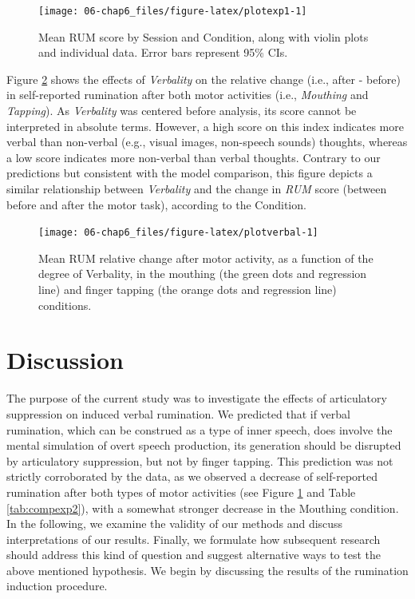 \documentclass[a4paper,12pt,twoside,openright,oldfontcommands]{memoir}
\begin{document}
\begin{figure}[H]
\texttt{[image: 06-chap6\_files/figure-latex/plotexp1-1]} \caption{Mean RUM score by Session and Condition, along with violin plots and individual data. Error bars represent 95\% CIs.}\label{fig:plotexp1}
\end{figure}

Figure \ref{fig:plotverbal} shows the effects of \emph{Verbality} on the relative change (i.e., after - before) in self-reported rumination after both motor activities (i.e., \emph{Mouthing} and \emph{Tapping}). As \emph{Verbality} was centered before analysis, its score cannot be interpreted in absolute terms. However, a high score on this index indicates more verbal than non-verbal (e.g., visual images, non-speech sounds) thoughts, whereas a low score indicates more non-verbal than verbal thoughts. Contrary to our predictions but consistent with the model comparison, this figure depicts a similar relationship between \emph{Verbality} and the change in \emph{RUM} score (between before and after the motor task), according to the Condition.

\begin{figure}[H]
\texttt{[image: 06-chap6\_files/figure-latex/plotverbal-1]} \caption{Mean RUM relative change after motor activity, as a function of the degree of Verbality, in the mouthing (the green dots and regression line) and finger tapping (the orange dots and regression line) conditions.}\label{fig:plotverbal}
\end{figure}

\hypertarget{discussion-3}{%
\section{Discussion}\label{discussion-3}}

The purpose of the current study was to investigate the effects of articulatory suppression on induced verbal rumination. We predicted that if verbal rumination, which can be construed as a type of inner speech, does involve the mental simulation of overt speech production, its generation should be disrupted by articulatory suppression, but not by finger tapping. This prediction was not strictly corroborated by the data, as we observed a decrease of self-reported rumination after both types of motor activities (see Figure \ref{fig:plotexp1} and Table \ref{tab:compexp2}), with a somewhat stronger decrease in the Mouthing condition. In the following, we examine the validity of our methods and discuss interpretations of our results. Finally, we formulate how subsequent research should address this kind of question and suggest alternative ways to test the above mentioned hypothesis. We begin by discussing the results of the rumination induction procedure.
\end{document}
